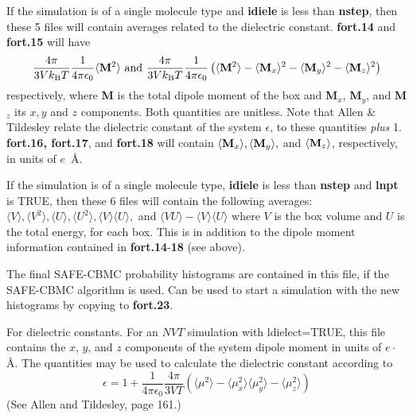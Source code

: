 \documentclass[12pt,letterpaper]{article}
\begin{document}
If the simulation is of a single molecule type and {\bf
  idiele} is less than {\bf nstep}, then these 5 files will
contain averages related to the dielectric constant. {\bf
  fort.14} and {\bf fort.15} will have
\begin{equation}
\frac{4\pi}{3Vk_{\rm B}T} \frac{1}{4\pi\epsilon_0}
\langle {\bf M}^2\rangle
\text{  and  }
\frac{4\pi}{3Vk_{\rm B}T}\frac{1}{4\pi\epsilon_0}
\left(\langle {\bf M}^2\rangle -
\langle {\bf M}_x\rangle^2 -
\langle{\bf M}_y\rangle^2 -
\langle{\bf M}_z\rangle^2 \right)
\end{equation}
respectively, where {\bf M} is the total dipole moment of
the box and {\bf M}$_x$, {\bf M}$_y$, and {\bf M}$_z$ its
$x, y$ and $z$ components. Both quantities are unitless.
Note that Allen \& Tildesley relate the dielectric constant
of the system $\epsilon$, to these quantities {\sl plus} 1.
{\bf fort.16, fort.17}, and {\bf fort.18} will contain
$\langle{\bf M}_x\rangle, \langle{\bf M}_y\rangle,$ and
$\langle{\bf M}_z\rangle$, respectively, in units of
$e$~\AA.

If the simulation is of a single molecule type, {\bf idiele} is less
than {\bf nstep} and {\bf lnpt} is TRUE, then these 6 files will
contain the following averages: $\langle V\rangle, \langle V^2
\rangle, \langle U \rangle, \langle U^2\rangle, \langle V
\rangle\langle U \rangle,$ and $\langle VU \rangle - \langle V \rangle
\langle U \rangle$ where $V$ is the box volume and $U$ is the total
energy, for each box.  This is in addition to the dipole moment
information contained in {\bf fort.14}-{\bf 18} (see above).

 The final SAFE-CBMC probability
histograms are contained in this file, if the SAFE-CBMC
algorithm is used. Can be used to start a simulation with
the new histograms by copying to {\bf fort.23}.

 For dielectric constants. For an
$NVT$ simulation with ldielect=TRUE, this file contains
the $x$, $y$, and $z$ components of the system dipole moment
in units of $e\cdot$\AA. The quantities may be used to
calculate the dielectric constant according to
\begin{equation}
\epsilon = 1 + \frac{1}{4\pi\epsilon_0} \frac{4 \pi}{3VT} \left ( \langle \mu^2 \rangle - \langle \mu_x^2 \rangle
 \langle \mu_y^2 \rangle - \langle \mu_z^2 \rangle \right )
\end{equation}
(See Allen and Tildesley, page 161.)
\end{document}
